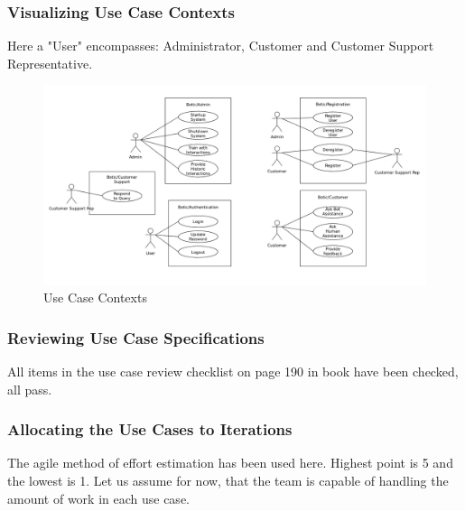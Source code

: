\documentclass[11pt]{article}
\begin{document}
\subsubsection{Visualizing Use Case Contexts}

Here a "User" encompasses: Administrator, Customer and Customer Support Representative.

\begin{figure}[H]
	\centering
	\hspace*{-1.8cm}\includegraphics[width=1.2\textwidth]{../../images/Botic_Use_Case_Context_Diagrams.png}
	\caption{Use Case Contexts}
\end{figure}

\subsubsection{Reviewing Use Case Specifications}

All items in the use case review checklist on page 190 in book\cite{Book:1} have been checked, all pass.

\subsubsection{Allocating the Use Cases to Iterations}

The agile method of effort estimation has been used here. Highest point is 5 and the lowest is 1. Let us assume for now, that the team is capable of handling the amount of work in each use case.
\end{document}
